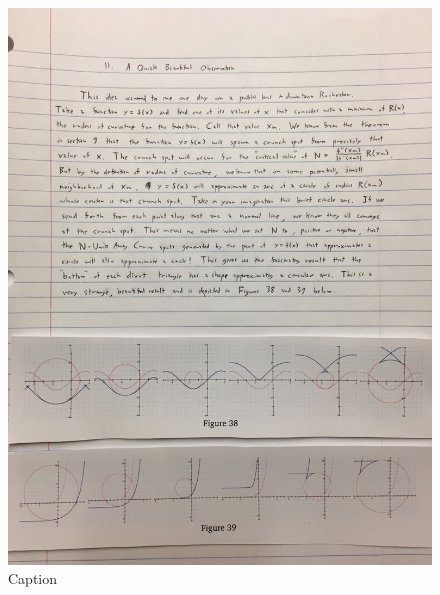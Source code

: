 \begin{figure}[H]
    \centering
    \begin{minipage}[b]{0.9\linewidth}
        \includegraphics[width = .9\linewidth, height = .25 \textheight, keepaspectratio]{beautiful-observation-img/Fig 11-38.png}
        \caption{Caption}
        \label{fig:fig11-38}
    \end{minipage}
    \begin{minipage}[b]{0.9\linewidth}

\end{minipage}
\end{figure}

